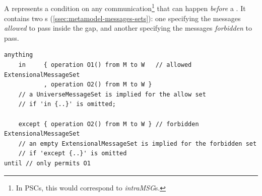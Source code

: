 \subsection{\msequencegap}\label{ssec:metamodel-sequences-gaps}

A \msequencegap{} represents a condition on any
communication\footnote{In PSCs, this would correspond to
  \emph{intraMSG}s.} that can happen \emph{before} a \msequenceaction.
It contains two \mmessageset s (\cref{ssec:metamodel-messages-sets}):
one specifying the messages \emph{allowed} to pass inside the gap, and
another specifying the messages \emph{forbidden} to pass.

\begin{lstlisting}[style=Example]
anything
    in     { operation O1() from M to W   // allowed ExtensionalMessageSet
           , operation O2() from M to W }
    // a UniverseMessageSet is implied for the allow set
    // if 'in {..}' is omitted;

    except { operation O2() from M to W } // forbidden ExtensionalMessageSet
    // an empty ExtensionalMessageSet is implied for the forbidden set
    // if 'except {..}' is omitted
until // only permits O1
\end{lstlisting}

